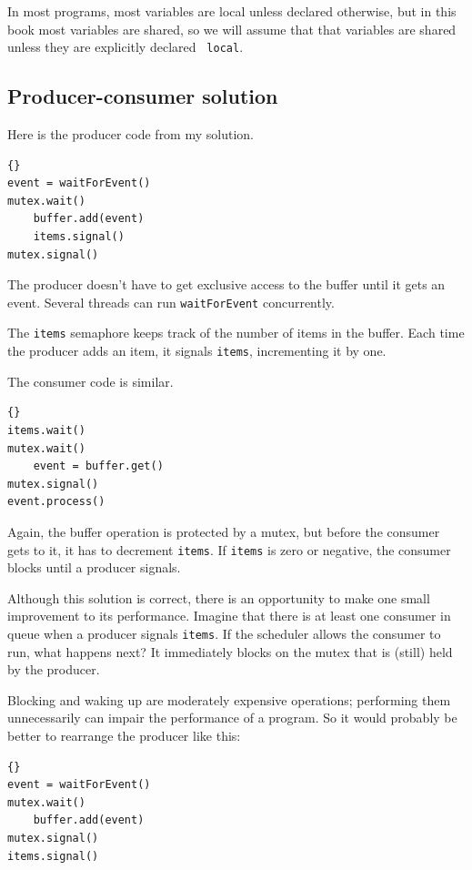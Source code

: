\documentclass{book}
\newcommand{\clearemptydoublepage}{\newpage\cleardoublepage}
\begin{document}
In most programs, most variables are local unless declared otherwise,
but in this book most variables are shared, so we will assume that
that variables are shared unless they are explicitly declared {\tt
local}.



\clearemptydoublepage
\subsection{Producer-consumer solution}

Here is the producer code from my solution.

\begin{lstlisting}[title={Producer solution}]{}
event = waitForEvent()
mutex.wait()
    buffer.add(event)
    items.signal()
mutex.signal()
\end{lstlisting}

The producer doesn't have to get exclusive access to the buffer
until it gets an event.  Several threads can run {\tt waitForEvent}
concurrently.

The {\tt items} semaphore keeps track of the
number of items in the buffer.  Each time the producer adds an
item, it signals {\tt items}, incrementing it by one.

The consumer code is similar.

\begin{lstlisting}[title={Consumer solution}]{}
items.wait()
mutex.wait()
    event = buffer.get()
mutex.signal()
event.process()
\end{lstlisting}

Again, the buffer operation is protected by a mutex,
but before the consumer gets to it, it has to decrement
{\tt items}.  If {\tt items} is zero or negative, the
consumer blocks until a producer signals.

Although this solution is correct, there is an opportunity
to make one small improvement to its performance.  Imagine
that there is at least one consumer in queue when a producer
signals {\tt items}.  If the scheduler allows the consumer
to run, what happens next?  It immediately blocks on the
mutex that is (still) held by the producer.

Blocking and waking up are moderately expensive operations;
performing them unnecessarily can impair the performance of
a program.  So it would probably be better to rearrange the
producer like this:

\begin{lstlisting}[title={Improved producer solution}]{}
event = waitForEvent()
mutex.wait()
    buffer.add(event)
mutex.signal()
items.signal()
\end{lstlisting}
\end{document}
